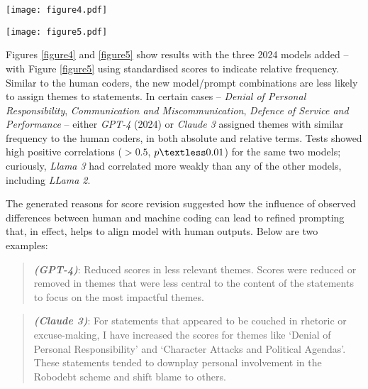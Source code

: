 \documentclass{article}
\begin{document}
\begin{figure*}[ht]
\vskip 0.2in
\begin{center}
\centerline{\texttt{[image: figure4.pdf]}}
\caption{Comparison, with 2024 models and modified instructions}
\label{figure4}
\end{center}
\vskip -0.2in
\end{figure*}


\begin{figure*}[ht]
\vskip 0.2in
\begin{center}
\centerline{\texttt{[image: figure5.pdf]}}
\caption{Comparison, with 2024 models and modified instructions - scores standardised}
\label{figure5}
\end{center}
\vskip -0.2in
\end{figure*}


Figures \ref{figure4} and \ref{figure5} show results with the three 2024 models added – with Figure \ref{figure5} using standardised scores to indicate relative frequency. Similar to the human coders, the new model/prompt combinations are less likely to assign themes to statements. In certain cases – \emph{Denial of Personal Responsibility}, \emph{Communication and Miscommunication}, \emph{Defence of Service and Performance} – either \emph{GPT-4} (2024) or \emph{Claude 3} assigned themes with similar frequency to the human coders, in both absolute and relative terms. Tests showed high positive correlations ($> 0.5$, $p \textless 0.01$) for the same two models; curiously, \emph{Llama 3} had correlated more weakly than any of the other models, including \emph{LLama 2}.

The generated reasons for score revision suggested how the influence of observed differences between human and machine coding can lead to refined prompting that, in effect, helps to align model with human outputs. Below are two examples:
 
    \begin{quote}
        \textbf{\emph{(GPT-4)}}: Reduced scores in less relevant themes. Scores were reduced or removed in themes that were less central to the content of the statements to focus on the most impactful themes. 
    \end{quote}

    \begin{quote}
        \textbf{\emph{(Claude 3)}}: For statements that appeared to be couched in rhetoric or excuse-making, I have increased the scores for themes like `Denial of Personal Responsibility’ and `Character Attacks and Political Agendas’. These statements tended to downplay personal involvement in the Robodebt scheme and shift blame to others. 
    \end{quote}
\end{document}
